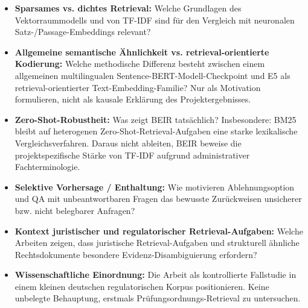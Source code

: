 \documentclass[11pt]{article}
\begin{document}
\begin{leitfragenbox}
\begin{itemize}
    \item \textbf{Sparsames vs. dichtes Retrieval:} Welche Grundlagen des Vektorraummodells und von TF-IDF sind f\"ur den Vergleich mit neuronalen Satz-/Passage-Embeddings relevant?
    \item \textbf{Allgemeine semantische Ähnlichkeit vs. retrieval-orientierte Kodierung:} Welche methodische Differenz besteht zwischen einem allgemeinen multilingualen Sentence-BERT-Modell-Checkpoint und E5 als retrieval-orientierter Text-Embedding-Familie? Nur als Motivation formulieren, nicht als kausale Erkl\"arung des Projektergebnisses.
    \item \textbf{Zero-Shot-Robustheit:} Was zeigt BEIR tats\"achlich? Insbesondere: BM25 bleibt auf heterogenen Zero-Shot-Retrieval-Aufgaben eine starke lexikalische Vergleichsverfahren. Daraus nicht ableiten, BEIR beweise die projektspezifische St\"arke von TF-IDF aufgrund administrativer Fachterminologie.
    \item \textbf{Selektive Vorhersage / Enthaltung:} Wie motivieren Ablehnungsoption und QA mit unbeantwortbaren Fragen das bewusste Zur\"uckweisen unsicherer bzw. nicht belegbarer Anfragen?
    \item \textbf{Kontext juristischer und regulatorischer Retrieval-Aufgaben:} Welche Arbeiten zeigen, dass juristische Retrieval-Aufgaben und strukturell \"ahnliche Rechtsdokumente besondere Evidenz-Disambiguierung erfordern?
    \item \textbf{Wissenschaftliche Einordnung:} Die Arbeit als kontrollierte Fallstudie in einem kleinen deutschen regulatorischen Korpus positionieren. Keine unbelegte Behauptung, erstmals Pr\"ufungsordnungs-Retrieval zu untersuchen.
\end{itemize}
\end{leitfragenbox}
\end{document}
